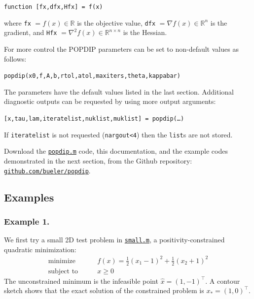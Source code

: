 \documentclass[11pt]{article}
\newcommand{\RR}{\mathbb{R}}
\newcommand{\grad}{\nabla}
\begin{document}
\medskip
\centerline{\texttt{function [fx,dfx,Hfx] = f(x)}}

\medskip
\noindent where \texttt{fx} $=f(x) \in\RR$ is the objective value, \texttt{dfx} $=\grad f(x) \in\RR^n$ is the gradient, and \texttt{Hfx} $= \grad^2 f(x) \in\RR^{n\times n}$ is the Hessian.

For more control the POPDIP parameters can be set to non-default values as follows:

\medskip
\centerline{\texttt{popdip(x0,f,A,b,rtol,atol,maxiters,theta,kappabar)}}

\medskip
\noindent The parameters have the default values listed in the last section.  Additional diagnostic outputs can be requested by using more output arguments:

\medskip
\centerline{\texttt{[x,tau,lam,iteratelist,nuklist,muklist] = popdip(\dots)}}

\medskip
\noindent If \texttt{iteratelist} is not requested (\texttt{nargout<4}) then the \texttt{list}s are not stored.

Download the \href{https://github.com/bueler/popdip/blob/main/matlab/popdip.m}{\texttt{popdip.m}} code, this documentation, and the example codes demonstrated in the next section, from the Github repository:\, \href{https://github.com/bueler/popdip}{\texttt{github.com/bueler/popdip}}.


\subsection*{Examples}

\subsubsection*{Example 1.}

We first try a small 2D test problem in \href{https://github.com/bueler/popdip/blob/main/matlab/small.m}{\texttt{small.m}}, a positivity-constrained quadratic minimization:
\begin{equation}
\begin{matrix}
\text{minimize} \qquad & f(x) = \frac{1}{2} (x_1-1)^2 + \frac{1}{2} (x_2+1)^2 \\
\text{subject to} \qquad & x \ge 0
\end{matrix} \label{eq:smallproblem}
\end{equation}
The unconstrained minimum is the infeasible point $\hat x =(1,-1)^\top$.  A contour sketch shows that the exact solution of the constrained problem is $x_*=(1,0)^\top$.
\end{document}
